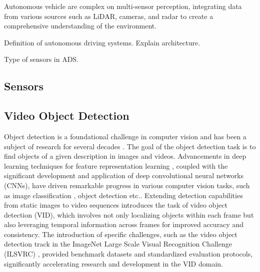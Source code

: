 
Autonomous vehicle are complex on multi-sensor perception, integrating data from various sources such as LiDAR, cameras, and radar to create a comprehensive understanding of the environment.

Definition of autonomous driving systems. Explain architecture.

Type of sensors in ADS.

\subsection{Sensors} \label{Background:Sensors}



\subsection{Video Object Detection} \label{Background:VideoObjectDetection}


Object detection is a foundational challenge in computer vision and has been a subject of research for several decades \cite{fischlerRepresentationMatchingPictorial1973}. The goal of the object detection task is to find objects of a given description in images and videos.
Advancements in deep learning techniques for feature representation learning \cite{hintonReducingDimensionalityData2006, lecunDeepLearning2015}, coupled with the significant development and application of deep convolutional neural networks (CNNs), have driven remarkable progress in various computer vision tasks, such as image classification \cite{}, object detection \cite{} etc..
Extending detection capabilities from static images to video sequences introduces the task of video object detection (VID), which involves not only localizing objects within each frame but also leveraging temporal information across frames for improved accuracy and consistency.
The introduction of specific challenges, such as the video object detection track in the ImageNet Large Scale Visual Recognition Challenge (ILSVRC) \cite{russakovskyImageNetLargeScale2015}, provided benchmark datasets and standardized evaluation protocols, significantly accelerating research and development in the VID domain.

